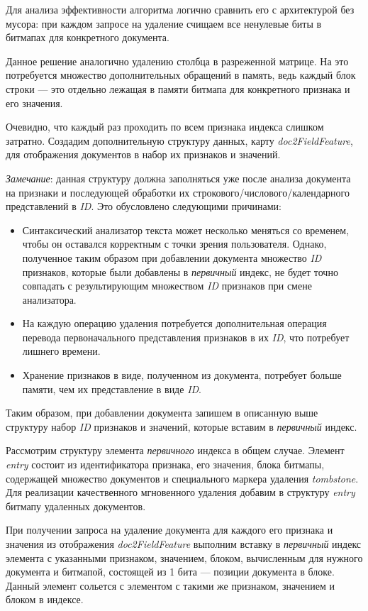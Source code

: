 Для анализа эффективности алгоритма логично сравнить его с архитектурой без мусора:
при каждом запросе на удаление счищаем все ненулевые биты в битмапах для конкретного
документа.

Данное решение аналогично удалению столбца в разреженной матрице. На это потребуется
множество дополнительных обращений в память, ведь каждый блок строки — это
отдельно лежащая в памяти битмапа для конкретного признака и его значения.

Очевидно, что каждый раз проходить по всем признака индекса слишком затратно. Создадим
дополнительную структуру данных, карту \textit{doc2FieldFeature}, для отображения
документов в набор их признаков и значений.

\textit{Замечание}: данная структуру должна заполняться уже после анализа документа на
признаки и последующей обработки их строкового/числового/календарного
представлений в \textit{ID}. Это обусловлено следующими причинами:
\begin{itemize}
    \item Синтаксический анализатор текста может несколько меняться со временем,
    чтобы он оставался корректным с точки зрения пользователя. Однако,
    полученное таким образом при добавлении документа множество \textit{ID} признаков,
    которые были добавлены в \textit{первичный} индекс, не будет точно совпадать с
    результирующим множеством \textit{ID} признаков при смене анализатора.
    \item На каждую операцию удаления потребуется дополнительная операция перевода
    первоначального представления признаков в их \textit{ID}, что потребует лишнего
    времени.
    \item Хранение признаков в виде, полученном из документа, потребует больше
    памяти, чем их представление в виде \textit{ID}.
\end{itemize}

Таким образом, при добавлении документа запишем в описанную выше структуру набор
\textit{ID} признаков и значений, которые вставим в \textit{первичный} индекс.

Рассмотрим структуру элемента \textit{первичного} индекса в общем случае. Элемент
\textit{entry} состоит из идентификатора признака, его значения, блока битмапы,
содержащей множество документов и специального маркера удаления
\textit{tombstone}. Для реализации качественного мгновенного удаления добавим в
структуру \textit{entry} битмапу удаленных документов.

При получении запроса на удаление документа для каждого его признака и
значения из отображения \textit{doc2FieldFeature} выполним вставку в
\textit{первичный} индекс элемента с указанными признаком, значением, блоком,
вычисленным для нужного документа и битмапой, состоящей из 1 бита — позиции
документа в блоке. Данный элемент сольется с элементом с такими же признаком,
значением и блоком в индексе.

